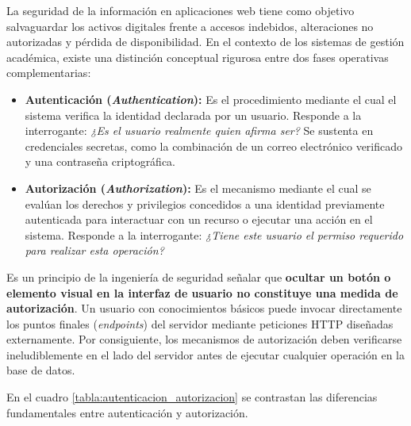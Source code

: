La seguridad de la información en aplicaciones web tiene como objetivo salvaguardar los activos digitales frente a accesos indebidos, alteraciones no autorizadas y pérdida de disponibilidad. En el contexto de los sistemas de gestión académica, existe una distinción conceptual rigurosa entre dos fases operativas complementarias:

\begin{itemize}
    \item \textbf{Autenticación (\textit{Authentication}):} Es el procedimiento mediante el cual el sistema verifica la identidad declarada por un usuario. Responde a la interrogante: \textit{¿Es el usuario realmente quien afirma ser?} Se sustenta en credenciales secretas, como la combinación de un correo electrónico verificado y una contraseña criptográfica.
    \item \textbf{Autorización (\textit{Authorization}):} Es el mecanismo mediante el cual se evalúan los derechos y privilegios concedidos a una identidad previamente autenticada para interactuar con un recurso o ejecutar una acción en el sistema. Responde a la interrogante: \textit{¿Tiene este usuario el permiso requerido para realizar esta operación?}
\end{itemize}

Es un principio de la ingeniería de seguridad señalar que \textbf{ocultar un botón o elemento visual en la interfaz de usuario no constituye una medida de autorización}. Un usuario con conocimientos básicos puede invocar directamente los puntos finales (\textit{endpoints}) del servidor mediante peticiones HTTP diseñadas externamente. Por consiguiente, los mecanismos de autorización deben verificarse ineludiblemente en el lado del servidor antes de ejecutar cualquier operación en la base de datos.

En el cuadro \ref{tabla:autenticacion_autorizacion} se contrastan las diferencias fundamentales entre autenticación y autorización.

